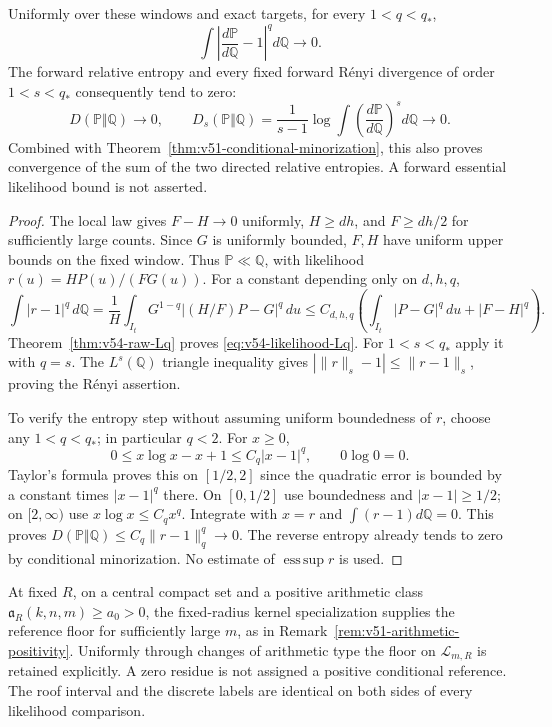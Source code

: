 \begin{theorem}
\label{thm:v54-forward-likelihood}
Uniformly over these windows and exact targets, for every $1<q<q_*$,
\begin{equation}\label{eq:v54-likelihood-Lq}
 \int\left|\frac{d\mathbb P}{d\mathbb Q}-1\right|^q
                                                   d\mathbb Q\to0.
\end{equation}
The forward relative entropy and every fixed forward R\'enyi
divergence of order $1<s<q_*$ consequently tend to zero:
\begin{equation}\label{eq:v54-forward-divergences}
 D(\mathbb P\Vert\mathbb Q)\to0,\qquad
 D_s(\mathbb P\Vert\mathbb Q)
 =\frac1{s-1}\log\int
        \left(\frac{d\mathbb P}{d\mathbb Q}\right)^s d\mathbb Q\to0.
\end{equation}
Combined with Theorem~\ref{thm:v51-conditional-minorization}, this
also proves convergence of the sum of the two directed relative
entropies. A forward essential likelihood bound is not asserted.
\end{theorem}
\begin{proof}
The local law gives $F-H\to0$ uniformly, $H\ge dh$, and $F\ge dh/2$
for sufficiently large counts. Since $G$ is uniformly bounded,
$F,H$ have uniform upper bounds on the fixed window. Thus
$\mathbb P\ll\mathbb Q$, with likelihood
$r(u)=HP(u)/(FG(u))$. For a constant depending only on $d,h,q$,
\[
 \int|r-1|^q\,d\mathbb Q
 =\frac1H\int_{I_t}G^{1-q}|(H/F)P-G|^q\,du
 \le C_{d,h,q}\left(\int_{I_t}|P-G|^q\,du+|F-H|^q\right).
\]
Theorem~\ref{thm:v54-raw-Lq} proves \eqref{eq:v54-likelihood-Lq}.
For $1<s<q_*$ apply it with $q=s$. The $L^s(\mathbb Q)$ triangle
inequality gives $|\|r\|_s-1|\le\|r-1\|_s$, proving the R\'enyi
assertion.

To verify the entropy step without assuming uniform boundedness of
$r$, choose any $1<q<q_*$; in particular $q<2$. For $x\ge0$,
\[
 0\le x\log x-x+1\le C_q|x-1|^q,
 \qquad 0\log0=0.
\]
Taylor's formula proves this on $[1/2,2]$ since the quadratic error
is bounded by a constant times $|x-1|^q$ there. On $[0,1/2]$ use
boundedness and $|x-1|\ge1/2$; on $[2,\infty)$ use
$x\log x\le C_q x^q$. Integrate with $x=r$ and
$\int(r-1)d\mathbb Q=0$. This proves
$D(\mathbb P\Vert\mathbb Q)\le C_q\|r-1\|_q^q\to0$.
The reverse entropy already tends to zero by conditional minorization.
No estimate of $\operatorname*{ess\,sup}r$ is used.
\end{proof}

\begin{remark}
At fixed $R$, on a central compact set and a positive arithmetic
class $\mathfrak a_R(k,n,m)\ge a_0>0$, the fixed-radius kernel
specialization supplies the reference floor for sufficiently large
$m$, as in Remark~\ref{rem:v51-arithmetic-positivity}. Uniformly
through changes of arithmetic type the floor on $\mathcal L_{m,R}$
is retained explicitly. A zero residue is not assigned a positive
conditional reference. The roof interval and the discrete labels
are identical on both sides of every likelihood comparison.
\end{remark}

